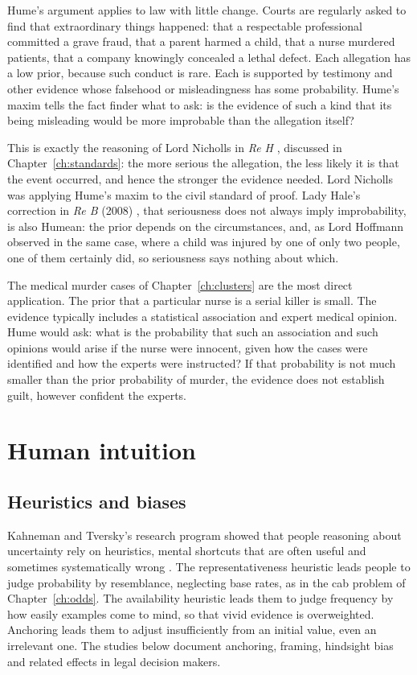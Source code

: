 Hume's argument applies to law with little change. Courts are regularly asked to find that extraordinary things happened: that a respectable professional committed a grave fraud, that a parent harmed a child, that a nurse murdered patients, that a company knowingly concealed a lethal defect. Each allegation has a low prior, because such conduct is rare. Each is supported by testimony and other evidence whose falsehood or misleadingness has some probability. Hume's maxim tells the fact finder what to ask: is the evidence of such a kind that its being misleading would be more improbable than the allegation itself?

This is exactly the reasoning of Lord Nicholls in \emph{Re H} \citep{reh1996}, discussed in Chapter~\ref{ch:standards}: the more serious the allegation, the less likely it is that the event occurred, and hence the stronger the evidence needed. Lord Nicholls was applying Hume's maxim to the civil standard of proof. Lady Hale's correction in \emph{Re B} (2008) \citep{reb2008}, that seriousness does not always imply improbability, is also Humean: the prior depends on the circumstances, and, as Lord Hoffmann observed in the same case, where a child was injured by one of only two people, one of them certainly did, so seriousness says nothing about which.

The medical murder cases of Chapter~\ref{ch:clusters} are the most direct application. The prior that a particular nurse is a serial killer is small. The evidence typically includes a statistical association and expert medical opinion. Hume would ask: what is the probability that such an association and such opinions would arise if the nurse were innocent, given how the cases were identified and how the experts were instructed? If that probability is not much smaller than the prior probability of murder, the evidence does not establish guilt, however confident the experts.

\section{Human intuition}

\subsection{Heuristics and biases}

Kahneman and Tversky's research program showed that people reasoning about uncertainty rely on heuristics, mental shortcuts that are often useful and sometimes systematically wrong \citep{tversky1974}. The representativeness heuristic leads people to judge probability by resemblance, neglecting base rates, as in the cab problem of Chapter~\ref{ch:odds}. The availability heuristic leads them to judge frequency by how easily examples come to mind, so that vivid evidence is overweighted. Anchoring leads them to adjust insufficiently from an initial value, even an irrelevant one. The studies below document anchoring, framing, hindsight bias and related effects in legal decision makers.

